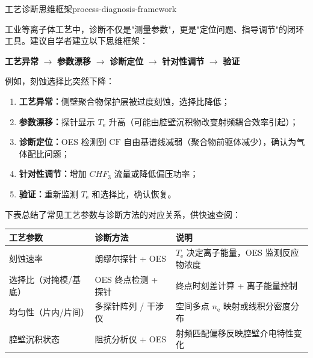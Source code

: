 \documentclass[12pt,a4paper,openany,oneside]{book}
\newcommand{\ee}{\mathrm{e}}
\newcommand{\difficulty}[1]{\marginnote{\hfill\textcolor{coverMid!80}{\rule[-0.1em]{2pt}{0.9em}}\,\textcolor{coverMid}{\footnotesize\textbf{[#1]}}}}
\begin{document}
\begin{insight}{工艺诊断思维框架}{process-diagnosis-framework}
\difficulty{提高}

工业等离子体工艺中，诊断不仅是"测量参数"，更是"定位问题、指导调节"的闭环工具。建议自学者建立以下思维框架：

\begin{center}
\textbf{工艺异常} $\longrightarrow$ \textbf{参数漂移} $\longrightarrow$ \textbf{诊断定位} $\longrightarrow$ \textbf{针对性调节} $\longrightarrow$ \textbf{验证}
\end{center}

例如，刻蚀选择比突然下降：
\begin{enumerate}
\item \textbf{工艺异常：}侧壁聚合物保护层被过度刻蚀，选择比降低；
\item \textbf{参数漂移：}探针显示 $T_\ee$ 升高（可能由腔壁沉积物改变射频耦合效率引起）；
\item \textbf{诊断定位：}OES 检测到 $\mathrm{CF}$ 自由基谱线减弱（聚合物前驱体减少），确认为气体配比问题；
\item \textbf{针对性调节：}增加 $CHF_3$ 流量或降低偏压功率；
\item \textbf{验证：}重新监测 $T_\ee$ 和选择比，确认恢复。
\end{enumerate}

下表总结了常见工艺参数与诊断方法的对应关系，供快速查阅：

\begin{center}
\begin{tabular}{@{}llp{5cm}@{}}
\toprule
\textbf{工艺参数} & \textbf{诊断方法} & \textbf{说明} \\
\midrule
刻蚀速率 & 朗缪尔探针 + OES & $T_\ee$ 决定离子能量，OES 监测反应物浓度 \\
选择比（对掩模/基底） & OES 终点检测 + 探针 & 终点时刻差计算 + 离子能量控制 \\
均匀性（片内/片间） & 多探针阵列 / 干涉仪 & 空间多点 $n_\ee$ 映射或线积分密度分布 \\
腔壁沉积状态 & 阻抗分析仪 + OES & 射频匹配偏移反映腔壁介电特性变化 \\
\bottomrule
\end{tabular}
\end{center}


\end{insight}
\end{document}
